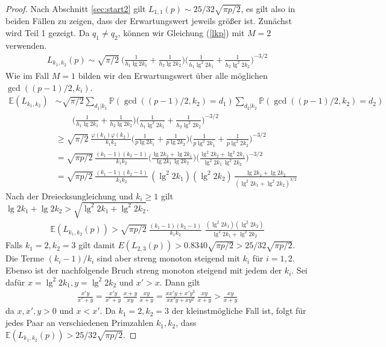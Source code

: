 \documentclass[a4paper, 10pt, ngerman]{article}
\newcommand{\E}{\mathbb{E}}
\renewcommand{\P}{\mathbb{P}}
\begin{document}
\begin{proof}
    Nach Abschnitt \ref{sec:start2} gilt $L_{1, 1}(p) \sim 25/32 \sqrt{\pi p /2}$, es gilt also in beiden Fällen zu zeigen, dass der Erwartungswert jeweils größer ist. Zunächst wird Teil 1 gezeigt. Da $q_1 \ne q_2$, können wir Gleichung (\ref{lkp}) mit $M = 2$ verwenden.
    \begin{align*}
        L_{k_1, k_2}(p) \sim \sqrt{\pi / 2} \ \Bigg (\frac 1 {h_1 \lg 2k_1} + \frac 1 {h_2 \lg 2k_2} \Bigg ) \Bigg ( \frac 1 {h_1 \lg^2 2k_1} + \frac 1 {h_2 \lg^2 2k_2} \Bigg )^{-3/2}
    \end{align*}
    Wie im Fall $M = 1$ bilden wir den Erwartungswert über alle möglichen $\gcd((p - 1)/2, k_i)$.
    \begin{align*}
        \E(L_{k_1, k_2})
         & \sim \sqrt{\pi / 2} \sum_{d_1 | k_1} \P(\gcd((p - 1)/2, k_2) = d_1) \sum_{d_2 | k_2} \P(\gcd((p - 1)/2, k_2) = d_2)                                                                                              \\
         & \qquad \Bigg (\frac 1 {h_1 \lg 2k_1} + \frac 1 {h_2 \lg 2k_2} \Bigg ) \Bigg ( \frac 1 {h_1 \lg^2 2k_1} + \frac 1 {h_2 \lg^2 2k_2} \Bigg )^{-3/2}                                                                 \\
         & \ge \sqrt{\pi / 2} \ \frac {\varphi(k_1) \varphi(k_2)} {k_1k_2} \Bigg (\frac 1 {p\lg 2k_1} + \frac 1 {p \lg 2k_2} \Bigg ) \Bigg ( \frac 1 {p \lg^2 2k_1} + \frac 1 {p \lg^2 2k_2} \Bigg )^{-3/2}                 \\
         & = \sqrt {\pi p / 2} \  \frac {(k_1 - 1)(k_2 - 1)} {k_1 k_2} \Bigg ( \frac {\lg 2k_2 + \lg 2k_1} {\lg 2k_1 \, \lg 2k_2} \Bigg ) \Bigg ( \frac {\lg^2 2k_2 + \lg^2 2k_1} {\lg^2 2k_1 \, \lg^2 2k_2} \Bigg )^{-3/2} \\
         & = \sqrt {\pi p / 2} \ \frac {(k_1 - 1)(k_2 - 1)} {k_1 k_2} \, (\lg^2 2k_1) (\lg^2 2k_2) \, \frac {\lg 2k_1 + \lg 2k_2} {(\lg^2 2k_1 + \lg^2 2k_2)^{3/2}}
    \end{align*}
    Nach der Dreiecksungleichung und $k_i \ge 1$ gilt $\lg 2k_1 + \lg 2k_2 > \sqrt{\lg^2 2k_1 + \lg^2 2k_2}$.
    \begin{align*}
        \E(L_{k_1, k_2}(p)) > \sqrt {\pi p / 2} \ \frac {(k_1 - 1)(k_2 - 1)} {k_1 k_2} \, \, \frac { (\lg^2 2k_1) (\lg^2 2k_2)} {\lg^2 2k_1 + \lg^2 2k_2}
    \end{align*}
    Falls $k_1 = 2, k_2 = 3$ gilt damit $E(L_{2, 3}(p)) > 0.8340 \sqrt{\pi p /2}  > 25 / 32 \sqrt{\pi p / 2}$. Die Terme $(k_i - 1)/k_i$ sind aber streng monoton steigend mit $k_i$ für $i = 1, 2$. Ebenso ist der nachfolgende Bruch streng monoton steigend mit jedem der $k_i$. Sei dafür $x = \lg^2 2k_1, y = \lg^2 2k_2$ und $x' > x$. Dann gilt
    \begin{align*}
        \frac {x'y} {x' + y}
        = \frac {x'y} {x' + y} \, \frac {x + y} {xy} \, \frac {xy} {x + y}
        = \frac {xx'y + x'y^2} {xx'y + xy^2} \, \frac {xy} {x + y} > \frac {xy} {x + y}
    \end{align*}
    da $x, x', y > 0$ und $x < x'$. Da $k_1 = 2, k_2 = 3$ der kleinstmögliche Fall ist, folgt für jedes Paar an verschiedenen Primzahlen $k_1, k_2$, dass $\E(L_{k_1, k_2}(p)) > 25 / 32 \sqrt{\pi p / 2}$.


\end{proof}
\end{document}
